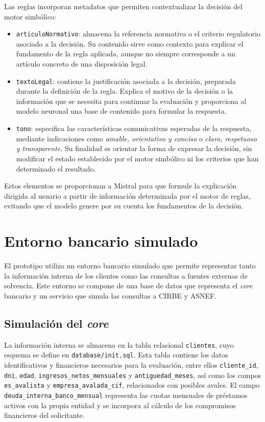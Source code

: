 \documentclass[12pt,a4paper]{report}
\begin{document}
Las reglas incorporan metadatos que permiten contextualizar la decisión del motor simbólico:

\begin{itemize}
    \item \texttt{articuloNormativo}: almacena la referencia normativa o el criterio regulatorio asociado a la decisión. Su contenido sirve como contexto para explicar el fundamento de la regla aplicada, aunque no siempre corresponde a un artículo concreto de una disposición legal.
    
    \item \texttt{textoLegal}: contiene la justificación asociada a la decisión, preparada durante la definición de la regla. Explica el motivo de la decisión o la información que se necesita para continuar la evaluación y proporciona al modelo neuronal una base de contenido para formular la respuesta.
    
    \item \texttt{tono}: especifica las características comunicativas esperadas de la respuesta, mediante indicaciones como \textit{amable, orientativo y conciso} o \textit{claro, respetuoso y transparente}. Su finalidad es orientar la forma de expresar la decisión, sin modificar el estado establecido por el motor simbólico ni los criterios que han determinado el resultado.
\end{itemize}

 Estos elementos se proporcionan a Mistral para que formule la explicación dirigida al usuario a partir de información determinada por el motor de reglas, evitando que el modelo genere por su cuenta los fundamentos de la decisión.

\section{Entorno bancario simulado}

El prototipo utiliza un entorno bancario simulado que permite representar tanto la información interna de los clientes como las consultas a fuentes externas de solvencia. Este entorno se compone de una base de datos que representa el \textit{core} bancario y un servicio que simula las consultas a CIRBE y ASNEF.

\subsection{Simulación del \textit{core}}

La información interna se almacena en la tabla relacional \texttt{clientes}, cuyo esquema se define en \texttt{database/init.sql}. Esta tabla contiene los datos identificativos y financieros necesarios para la evaluación, entre ellos \texttt{cliente\_id}, \texttt{dni}, \texttt{edad}, \texttt{ingresos\_netos\_mensuales} y \texttt{antiguedad\_meses}, así como los campos \texttt{es\_avalista} y \texttt{empresa\_avalada\_cif}, relacionados con posibles avales. El campo \texttt{deuda\_interna\_banco\_mensual} representa las cuotas mensuales de préstamos activos con la propia entidad y se incorpora al cálculo de los compromisos financieros del solicitante.
\end{document}
